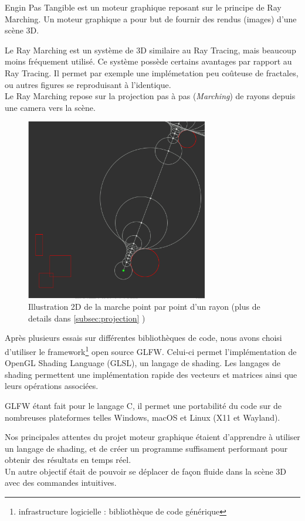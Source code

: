 
Engin Pas Tangible est un moteur graphique reposant sur le principe de Ray Marching. Un moteur graphique a pour but de fournir des rendus (images) d'une scène 3D.\par

Le Ray Marching est un système de 3D similaire au Ray Tracing, mais beaucoup moins fréquement utilisé. Ce système possède certains avantages par rapport au Ray Tracing. 
Il permet par exemple une implémetation peu coûteuse de fractales, ou autres figures se reproduisant à l'identique. \\
Le Ray Marching repose sur la projection pas à pas (\emph{Marching}) de rayons depuis une camera vers la scène.


\begin{figure}[h]
    \centering
    \includegraphics[width=8cm]{images/marching.png}
    \caption{Illustration 2D de la marche point par point d'un rayon (plus de details dans \ref{subsec:projection} )}
    \label{fig:my_label}
\end{figure}

Après plusieurs essais sur différentes bibliothèques de code, nous avons choisi d'utiliser le framework\footnote[1]{infrastructure logicielle : bibliothèque de code générique} open source GLFW. Celui-ci permet l'implémentation de OpenGL Shading Language (GLSL), un langage de shading. Les langages de shading permettent une implémentation rapide des vecteurs et matrices ainsi que leurs opérations associées.\par
GLFW étant fait pour le langage C, il permet une portabilité du code sur de nombreuses plateformes telles Windows, macOS et Linux (X11 et Wayland).\\ \par

Nos principales attentes du projet moteur graphique étaient d'apprendre à utiliser un langage de shading, et de créer un programme suffisament performant pour obtenir des résultats en temps réel. \\
Un autre objectif était de pouvoir se déplacer de façon fluide dans la scène 3D avec des commandes intuitives.